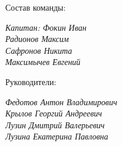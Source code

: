 \large Состав команды:

\begin{flushleft}
	\emph{Капитан: Фокин Иван} \\
	\emph{Радионов Максим} \\
	\emph{Сафронов Никита} \\
	\emph{Максимычев Евгений}
\end{flushleft}

\large Руководители:

\begin{flushleft}
	\emph{Федотов Антон Владимирович} \\
	\emph{Крылов Георгий Андреевич} \\
	\emph{Лузин Дмитрий Валерьевич} \\
	\emph{Лузина Екатерина Павловна}
\end{flushleft} 

\newpage
